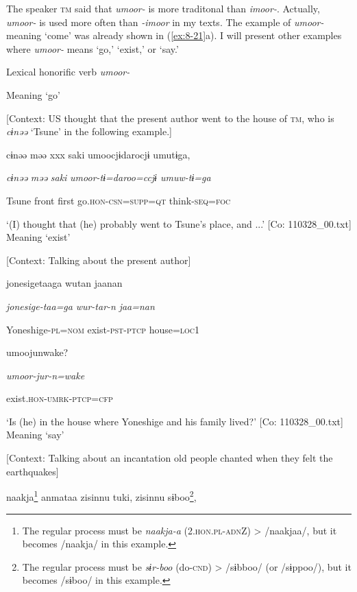 The speaker \textsc{tm} said that \textit{umoor-} is more traditonal than \textit{imoor-}. Actually, \textit{umoor-} is used more often than \textit{{}-imoor} in my texts. The example of \textit{umoor-} meaning ‘come’ was already shown in (\ref{ex:8-21}a). I will present other examples where \textit{umoor-} means ‘go,’ ‘exist,’ or ‘say.’

\ea\label{ex:8-22}
  Lexical honorific verb \textit{umoor-}

\ea Meaning ‘go’

    [Context: US thought that the present author went to the house of \textsc{tm}, who is \textit{cɨnəə} ‘Tsune’ in the following example.]

   {\US}
\glll   cɨnəə  məə  xxx  saki  umoocjɨdarocjɨ  umutɨga,

      \textit{cɨnəə}  \textit{məə}    \textit{saki}  \textit{umoor{}-tɨ=daroo=ccjɨ  umuw-tɨ=ga}

      Tsune  front    first  go.\textsc{hon}-\textsc{csn}=\textsc{supp}=\textsc{qt}  think-\textsc{seq}=\textsc{foc}

\glt ‘(I) thought that (he) probably went to Tsune’s place, and ...’ [Co: 110328\_00.txt]
\ex Meaning ‘exist’

    [Context: Talking about the present author]

   {\US}
\glll   jonesigetaaga  wutan  jaanan

      \textit{jonesige-taa=ga}  \textit{wur-tar-n}  \textit{jaa=nan}  

      Yoneshige-\textsc{pl}=\textsc{nom}  exist-\textsc{pst}-\textsc{ptcp}  house=\textsc{loc}1

      umoojunwake?

      \textit{umoor{}-jur-n=wake}

      exist.\textsc{hon}-\textsc{umrk}-\textsc{ptcp}=\textsc{cfp}

\glt ‘Is (he) in the house where Yoneshige and his family lived?’ [Co: 110328\_00.txt]
\ex Meaning ‘say’

    [Context: Talking about an incantation old people chanted when they felt the earthquakes]

    {\TM}
\glll  naakja\footnote{The regular process must be \textit{naakja-a} (2.\textsc{hon}.\textsc{pl}-\textsc{adn}Z) > /naakjaa/, but it becomes /naakja/ in this example.}  anmataa  zisinnu  tuki,  zisinnu  sɨboo\footnote{The regular process must be \textit{sɨr-boo} (do-\textsc{cnd}) > /sɨbboo/ (or /sɨppoo/), but it becomes /sɨboo/ in this example.},

